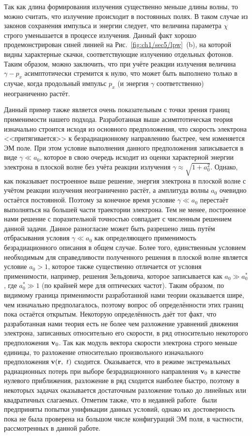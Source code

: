 Так как длина формирования излучения существенно меньше длины волны, то можно считать, что излучение происходит в постоянных полях.
В таком случае из законов сохранения импульса и энергии следует, что величина параметра $\chi$ строго уменьшается в процессе излучения.
Данный факт хорошо продемонстрирован синей линией на Рис.~\ref{fig:ch1/sec5/lpw}~(b), на которой видны характерные скачки, соответствующие излучению отдельных фотонов.
Таким образом, можно заключить, что при учёте реакции излучения величина $\gamma - p_x$ асимптотически стремится к нулю, что может быть выполнено только в случае, когда продольный импульс $p_x$ (и энергия $\gamma$ соответственно) неограниченно растёт.

Данный пример также является очень показательным с точки зрения границ применимости нашего подхода.
Разработанная выше асимптотическая теория изначально строится исходя из основного предположения, что скорость электрона <<притягивается>> к безрадиационному направлению быстрее, чем изменяется ЭМ поле.
При этом условие выполнения данного предположения записывается в виде $\gamma \ll a_0$, которое в свою очередь исходит из оценки характерной энергии электрона в плоской волне без учёта реакции излучения $\gamma\approx\sqrt{1+a_0^2}$.
Однако, как показывает построенное выше решение, энергия электрона в плоской волне с учётом реакции излучения неограниченно растёт, а амплитуда волны $a_0$ очевидно остаётся постоянной.
Поэтому за конечное время условие $\gamma \ll a_0$ перестаёт выполняться на большей части траектории электрона.
Тем не менее, построенное нами решение с поразительной точностью совпадает с численным решением данной задачи.
Данное разногласие может быть разрешено лишь путём отбрасывания условия $\gamma \ll a_0$ как определяющего применимость безрадиационного описания в общем случае.
Более того, единственным условием необходимым для справедливости полученного решения в плоской волне является условие $a_0 > 1$, которое также существенно отличается от условия применимости, например, решения Зельдовича, которое записывается как ${a_0 \gg a_0^*}$, где ${a_0^* \gg 1}$ (по крайней мере для оптических частот).
Таким образом, по видимому граница применимости разработанной нами теории оказывается шире, чем изначально предполагалось, поэтому вопрос об определённости этих границ пока остаётся открытым.
Некоторую определённость даёт тот факт, что разработанная нами теория есть не более чем разложение уравнений движения электрона, записанных относительно его скорости, в ряд относительно некоторого предположения $\vb{v}_0$.
Так как модуль вектора скорости электрона строго меньше единицы, то разложение относительно произвольного изначального предположения $\vb{v}(\vb{r},\ t)$ сходится.
Оказывается, что в режиме экстремальных радиационных потерь при выборе безрадиационного направления $\vb{v}_0$ в качестве нулевого приближения, разложение в ряд сходится наиболее быстро, поэтому в некоторых задачах оказывается достаточным разложение только до линейных или квадратичных слагаемых.
Отметим также, что в недавней работе~\cite{cai2022dynamics} были предприняты попытки унификации данных условий, однако их достоверность пока не была проверена на большом числе конфигураций ЭМ поля, в частности, рассмотренных в данной работе. 

